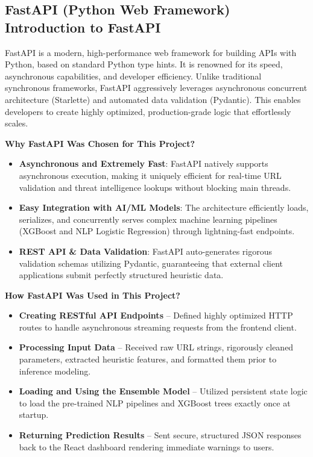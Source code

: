 \subsection{FastAPI (Python Web Framework) Introduction to FastAPI}
\noindent
FastAPI is a modern, high-performance web framework for building APIs with Python, based on standard Python type hints. It is renowned for its speed, asynchronous capabilities, and developer efficiency. Unlike traditional synchronous frameworks, FastAPI aggressively leverages asynchronous concurrent architecture (Starlette) and automated data validation (Pydantic). This enables developers to create highly optimized, production-grade logic that effortlessly scales.

\noindent
\textbf{Why FastAPI Was Chosen for This Project?}

\begin{itemize}
\item \textbf{Asynchronous and Extremely Fast}: FastAPI natively supports asynchronous execution, making it uniquely efficient for real-time URL validation and threat intelligence lookups without blocking main threads.
\item \textbf{Easy Integration with AI/ML Models}: The architecture efficiently loads, serializes, and concurrently serves complex machine learning pipelines (XGBoost and NLP Logistic Regression) through lightning-fast endpoints.
\item \textbf{REST API \& Data Validation}: FastAPI auto-generates rigorous validation schemas utilizing Pydantic, guaranteeing that external client applications submit perfectly structured heuristic data.
\end{itemize}
\noindent
\textbf{How FastAPI Was Used in This Project?}

\begin{itemize}
\item \textbf{Creating RESTful API Endpoints} -- Defined highly optimized HTTP routes to handle asynchronous streaming requests from the frontend client.
\item \textbf{Processing Input Data} -- Received raw URL strings, rigorously cleaned parameters, extracted heuristic features, and formatted them prior to inference modeling.
\item \textbf{Loading and Using the Ensemble Model} -- Utilized persistent state logic to load the pre-trained NLP pipelines and XGBoost trees exactly once at startup.
\item \textbf{Returning Prediction Results} -- Sent secure, structured JSON responses back to the React dashboard rendering immediate warnings to users.
\end{itemize}

